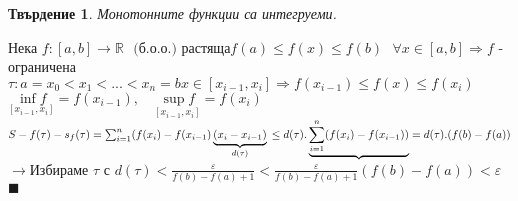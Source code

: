 \documentclass[12pt]{article}
\newtheorem{proposition}{Твърдение}
\newcommand{\spc}{\text{ }}
\begin{document}
	\begin{proposition}
		Монотонните функции са интегруеми.
	\end{proposition}
	Нека $f:[a,b]\rightarrow\mathbb{R}\spc\text{(б.о.о.) растяща}$\hfill$f(a)\leq f(x)\leq f(b)\spc \forall x\in[a,b]\Rightarrow f$ - ограничена\\
	$\tau:a=x_0<x_1<...<x_n=b$\hfill$ x\in[x_{i-1},x_i]\Rightarrow f(x_{i-1})\leq f(x)\leq f(x_i)$
	$\underset{[x_{i-1},x_i]}{\inf f}=f(x_{i-1}),\quad \underset{[x_{i-1},x_i]}{\sup f}=f(x_{i})$\\
	$S-f(\tau)-s_f(\tau)=\sum_{i=1}^{n}(f(x_i)-f(x_{i-1})\underbrace{(x_i-x_{i-1})}_{d(\tau)}\\
	\leq d(\tau).\underbrace{\sum_{i=1}^{n}(f(x_i)-f(x_{i-1}))}=d(\tau).(f(b)-f(a))$\\
	$\rightarrow$Избираме $\tau$ с $d(\tau)<\frac{\varepsilon}{f(b)-f(a)+1}<\frac{\varepsilon}{f(b)-f(a)+1}(f(b)-f(a))<\varepsilon$
	\hfill$\blacksquare$\\
	
\end{document}
